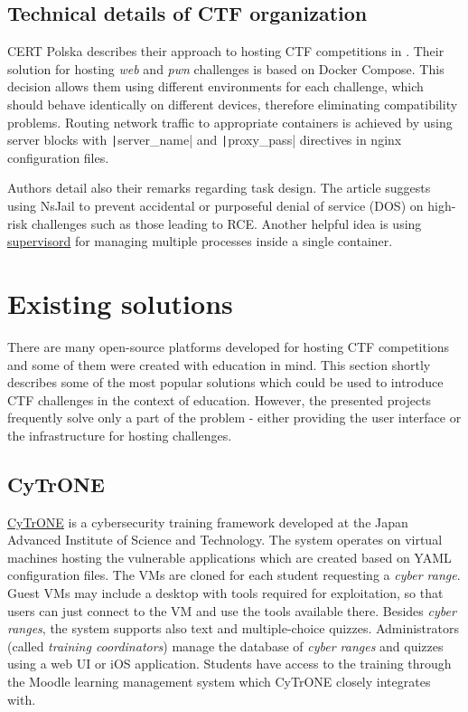 \subsection{Technical details of CTF organization}

CERT Polska describes their approach to hosting CTF competitions in \cite{bib:hack.cert.pl}. Their solution for hosting \textit{web} and \textit{pwn} challenges is based on Docker Compose. This decision allows them using different environments for each challenge, which should behave identically on different devices, therefore eliminating compatibility problems. Routing network traffic to appropriate containers is achieved by using server blocks with \texttt|server_name| and \texttt|proxy_pass| directives in nginx configuration files.

Authors detail also their remarks regarding task design. The article suggests using NsJail to prevent accidental or purposeful denial of service (DOS) on high-risk challenges such as those leading to RCE. Another helpful idea is using \href{https://github.com/Supervisor/supervisor}{supervisord} for managing multiple processes inside a single container.

\section{Existing solutions}
\label{sec:existing-solutions}

There are many open-source platforms developed for hosting CTF competitions and some of them were created with education in mind. This section shortly describes some of the most popular solutions which could be used to introduce CTF challenges in the context of education. However, the presented projects frequently solve only a part of the problem - either providing the user interface or the infrastructure for hosting challenges.

\subsection{CyTrONE}

\href{https://github.com/crond-jaist/cytrone}{CyTrONE} \cite{bib:cytrone} is a cybersecurity training framework developed at the Japan Advanced Institute of Science and Technology. The system operates on virtual machines hosting the vulnerable applications which are created based on YAML configuration files. The VMs are cloned for each student requesting a \textit{cyber range}. Guest VMs may include a desktop with tools required for exploitation, so that users can just connect to the VM and use the tools available there. Besides \textit{cyber ranges}, the system supports also text and multiple-choice quizzes. Administrators (called \textit{training coordinators}) manage the database of \textit{cyber ranges} and quizzes using a web UI or iOS application. Students have access to the training through the Moodle learning management system which CyTrONE closely integrates with.

